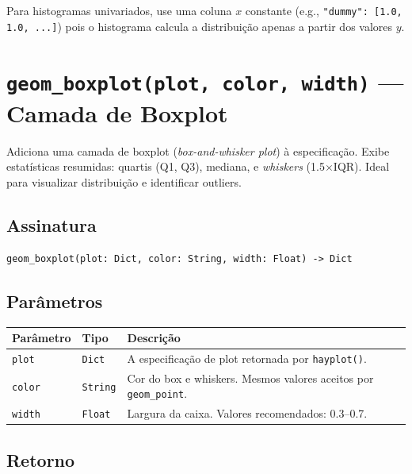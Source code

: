 \documentclass[12pt, a4paper, oneside]{book}
\newcommand{\code}[1]{\texttt{#1}}
\begin{document}
\begin{tipbox}[title={\textbf{Dica:} Dummy $x$ para histogramas}]
  Para histogramas univariados, use uma coluna $x$ constante (e.g., \code{"dummy": [1.0, 1.0, ...]})
  pois o histograma calcula a distribuição apenas a partir dos valores $y$.
\end{tipbox}

\section{\texttt{geom\_boxplot(plot, color, width)} --- Camada de Boxplot}

Adiciona uma camada de boxplot (\textit{box-and-whisker plot}) à especificação.
Exibe estatísticas resumidas: quartis (Q1, Q3), mediana, e \textit{whiskers}
(1.5$\times$IQR). Ideal para visualizar distribuição e identificar outliers.

\subsection*{Assinatura}

\begin{lstlisting}[style=inline]
geom_boxplot(plot: Dict, color: String, width: Float) -> Dict
\end{lstlisting}

\subsection*{Parâmetros}

\begin{tabularx}{\textwidth}{@{}lL{2.5cm}X@{}}
  \toprule
  \textbf{Parâmetro} & \textbf{Tipo} & \textbf{Descrição} \\
  \midrule
  \code{plot}  & \code{Dict}   & A especificação de plot retornada por \code{hayplot()}. \\[4pt]
  \code{color} & \code{String} & Cor do box e whiskers. Mesmos valores aceitos por \code{geom\_point}. \\[4pt]
  \code{width} & \code{Float}  & Largura da caixa. Valores recomendados: 0.3--0.7. \\
  \bottomrule
\end{tabularx}

\subsection*{Retorno}
\end{document}
